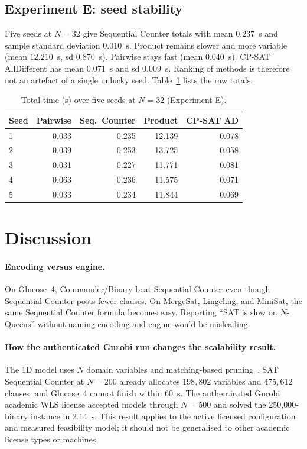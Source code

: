 \documentclass[a4paper,fleqn]{cas-sc}
\begin{document}
\subsection{Experiment E: seed stability}
Five seeds at $N=32$ give Sequential Counter totals with mean $0.237$~s and sample standard deviation $0.010$~s.
Product remains slower and more variable (mean $12.210$~s, sd $0.870$~s).
Pairwise stays fast (mean $0.040$~s).
CP-SAT AllDifferent has mean $0.071$~s and sd $0.009$~s.
Ranking of methods is therefore not an artefact of a single unlucky seed.
Table~\ref{tab:stability} lists the raw totals.

\begin{table}[t]
\centering
\caption{Total time (s) over five seeds at $N=32$ (Experiment E).}
\label{tab:stability}
\begin{tabular*}{\tblwidth}{@{\extracolsep{\fill}}lrrrr@{}}
\toprule
Seed & Pairwise & Seq.\ Counter & Product & CP-SAT AD \\
\midrule
1 & 0.033 & 0.235 & 12.139 & 0.078 \\
2 & 0.039 & 0.253 & 13.725 & 0.058 \\
3 & 0.031 & 0.227 & 11.771 & 0.081 \\
4 & 0.063 & 0.236 & 11.575 & 0.071 \\
5 & 0.033 & 0.234 & 11.844 & 0.069 \\
\bottomrule
\end{tabular*}
\end{table}

\section{Discussion}
\label{sec:discussion}

\paragraph{Encoding versus engine.}
On Glucose~4, Commander/Binary beat Sequential Counter even though Sequential Counter posts fewer clauses.
On MergeSat, Lingeling, and MiniSat, the same Sequential Counter formula becomes easy.
Reporting ``SAT is slow on $N$-Queens'' without naming encoding and engine would be misleading.

\paragraph{How the authenticated Gurobi run changes the scalability result.}
The 1D model uses $N$ domain variables and matching-based pruning~\cite{regin1994filtering}.
SAT Sequential Counter at $N=200$ already allocates $198{,}802$ variables and $475{,}612$ clauses, and Glucose~4 cannot finish within 60~s.
The authenticated Gurobi academic WLS license accepted models through $N=500$ and solved the 250{,}000-binary instance in 2.14~s.
This result applies to the active licensed configuration and measured feasibility model; it should not be generalised to other academic license types or machines.
\end{document}
